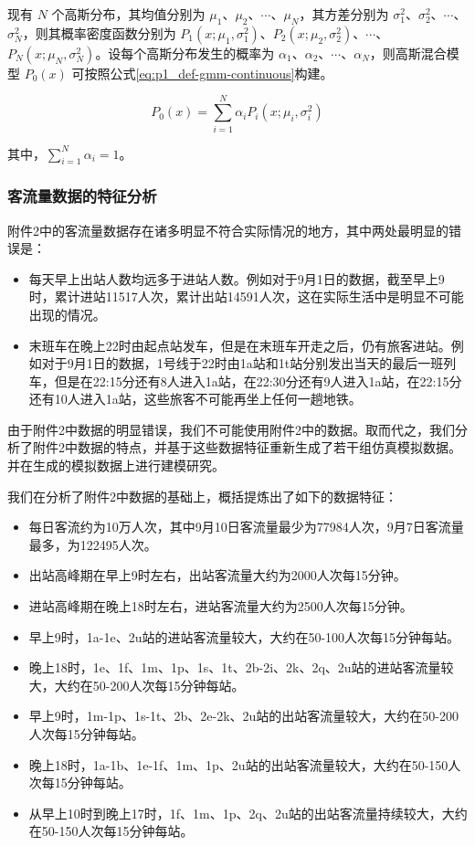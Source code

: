 \documentclass[12pt,a4paper]{mcmthesis}
\begin{document}
现有 $N$ 个高斯分布，其均值分别为 $\mu_1$、$\mu_2$、$\cdots$、$\mu_N$，其方差分别为 $\sigma^2_1$、$\sigma^2_2$、$\cdots$、$\sigma^2_N$，则其概率密度函数分别为 $P_1(x;\mu_1,\sigma^2_1)$、$P_2(x;\mu_2,\sigma^2_2)$、$\cdots$、$P_N(x;\mu_N,\sigma^2_N)$。设每个高斯分布发生的概率为 $\alpha_1$、$\alpha_2$、$\cdots$、$\alpha_N$，则高斯混合模型 $P_0(x)$ 可按照公式\ref{eq:p1_def-gmm-continuous}构建。

\begin{equation}
    P_0(x) = \sum_{i=1}^{N} \alpha_i P_i(x;\mu_i,\sigma^2_i)
    \label{eq:p1_def-gmm-continuous}
\end{equation}

其中，$\sum_{i=1}^{N} \alpha_i=1$。

\subsubsection{客流量数据的特征分析}

附件2中的客流量数据存在诸多明显不符合实际情况的地方，其中两处最明显的错误是：

\begin{itemize}
  \item 每天早上出站人数均远多于进站人数。例如对于9月1日的数据，截至早上9时，累计进站11517人次，累计出站14591人次，这在实际生活中是明显不可能出现的情况。
  \item 末班车在晚上22时由起点站发车，但是在末班车开走之后，仍有旅客进站。例如对于9月1日的数据，1号线于22时由1a站和1t站分别发出当天的最后一班列车，但是在22:15分还有8人进入1a站，在22:30分还有9人进入1a站，在22:15分还有10人进入1a站，这些旅客不可能再坐上任何一趟地铁。
\end{itemize}

由于附件2中数据的明显错误，我们不可能使用附件2中的数据。取而代之，我们分析了附件2中数据的特点，并基于这些数据特征重新生成了若干组仿真模拟数据。并在生成的模拟数据上进行建模研究。

我们在分析了附件2中数据的基础上，概括提炼出了如下的数据特征：

\begin{itemize}
  \item 每日客流约为10万人次，其中9月10日客流量最少为77984人次，9月7日客流量最多，为122495人次。
  \item 出站高峰期在早上9时左右，出站客流量大约为2000人次每15分钟。
  \item 进站高峰期在晚上18时左右，进站客流量大约为2500人次每15分钟。
  \item 早上9时，1a-1e、2u站的进站客流量较大，大约在50-100人次每15分钟每站。
  \item 晚上18时，1e、1f、1m、1p、1s、1t、2b-2i、2k、2q、2u站的进站客流量较大，大约在50-200人次每15分钟每站。
  \item 早上9时，1m-1p、1s-1t、2b、2e-2k、2u站的出站客流量较大，大约在50-200人次每15分钟每站。
  \item 晚上18时，1a-1b、1e-1f、1m、1p、2u站的出站客流量较大，大约在50-150人次每15分钟每站。
  \item 从早上10时到晚上17时，1f、1m、1p、2q、2u站的出站客流量持续较大，大约在50-150人次每15分钟每站。
\end{itemize}
\end{document}

